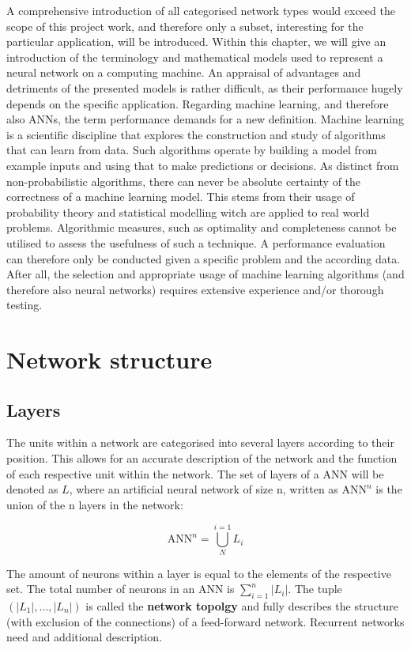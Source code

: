 \documentclass[10pt,a4paper,DIV=11]{scrreprt}
\begin{document}
A comprehensive introduction of all categorised network types would exceed the scope of this project work, and therefore only a subset, interesting for the particular application, will be introduced. 
Within this chapter, we will give an introduction of the terminology and mathematical models used to represent a neural network on a computing machine. 
An appraisal of advantages and detriments of the presented models is rather difficult, as their performance hugely depends on the specific application. 
Regarding machine learning, and therefore also ANNs, the term performance demands for a new definition. Machine learning is a scientific discipline 
that explores the construction and study of algorithms that can learn from data.\cite{MLDEF1} 
Such algorithms operate by building a model from example inputs and using that to make predictions or decisions.\cite{MLDEF2} 
As distinct from non-probabilistic algorithms, there can never be absolute certainty of the correctness of a machine learning model. 
This stems from their usage of probability theory and statistical modelling witch are applied to real world problems. 
Algorithmic measures, such as optimality and completeness cannot be utilised to assess the usefulness of such a technique.
A performance evaluation can therefore only be conducted given a specific problem and the according data. After all, the selection and 
appropriate usage of machine learning algorithms (and therefore also neural networks) requires extensive experience and/or thorough testing. 

\section{Network structure}
\subsection{Layers}
The units within a network are categorised into several layers according to their position. This allows for an accurate description of the network and the function of each respective unit within the network. The set of layers of a ANN will be denoted as $L$, where an artificial neural network of size n, written as $\text{ANN}^n$ is the union of the n layers in the network:

\begin{equation}
    \text{ANN}^n = \bigcup_{N}^{i=1}{L_i}
\end{equation}

The amount of neurons within a layer is equal to the elements of the respective set. The total number of neurons in an ANN is $\sum_{i=1}^{n}{|L_i|}$. The tuple $(|L_1|,...,|L_n|)$ is called the \textbf{network topolgy} and fully describes the structure (with exclusion of the connections) of a feed-forward network. Recurrent networks need and additional description.
\end{document}
